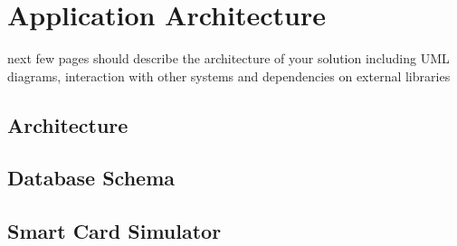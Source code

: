 \chapter{Application Architecture}\label{chapter:application_architecture}

next few pages should describe the architecture of your solution including UML diagrams, interaction with other systems and dependencies on external libraries

\section{Architecture}

\section{Database Schema}

\section{Smart Card Simulator}